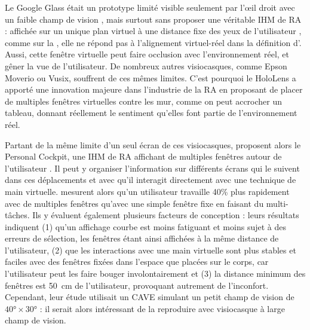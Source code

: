 Le Google Glass était un prototype limité visible seulement par l'\oe il droit avec un faible champ de vision , mais surtout sans proposer une véritable IHM de RA : affichée sur un unique plan virtuel à une distance fixe des yeux de l'utilisateur , comme sur la , elle ne répond pas à l'alignement virtuel-réel dans la définition d'\cite{Azuma1997}. Aussi, cette fenêtre virtuelle peut faire occlusion avec l'environnement réel, et gêner la vue de l'utilisateur. De nombreux autres visiocasques, comme Epson Moverio ou Vusix, souffrent de ces mêmes limites. C'est pourquoi le HoloLens a apporté une innovation majeure dans l'industrie de la RA en proposant de placer de multiples fenêtres virtuelles contre les mur, comme on peut accrocher un tableau, donnant réellement le sentiment qu'elles font partie de l'environnement réel.


Partant de la même limite d'un seul écran de ces visiocasques, \cite{Ens2014} proposent alors le Personal Cockpit, une IHM de RA affichant de multiples fenêtres autour de l'utilisateur . Il peut y organiser l'information sur différents écrans qui le suivent dans ces déplacements et avec qu'il interagit directement avec une technique de main virtuelle. \citeauthor{Ens2014} mesurent alors qu'un utilisateur travaille 40\% plus rapidement avec de multiples fenêtres qu'avec une simple fenêtre fixe en faisant du multi-tâches. Ils y évaluent également plusieurs facteurs de conception : leurs résultats indiquent (1) qu'un affichage courbe est moins fatiguant et moins sujet à des erreurs de sélection, les fenêtres étant ainsi affichées à la même distance de l'utilisateur, (2) que les interactions avec une main virtuelle sont plus stables et faciles avec des fenêtres fixées dans l'espace que placées sur le corps, car l'utilisateur peut les faire bouger involontairement et (3) la distance minimum des fenêtres est \SI{50}{\cm} de l'utilisateur, provoquant autrement de l'inconfort. Cependant, leur étude utilisait un CAVE simulant un petit champ de vision de $\ang{40} \times \ang{30}$ : il serait alors intéressant de la reproduire avec visiocasque à large champ de vision.

